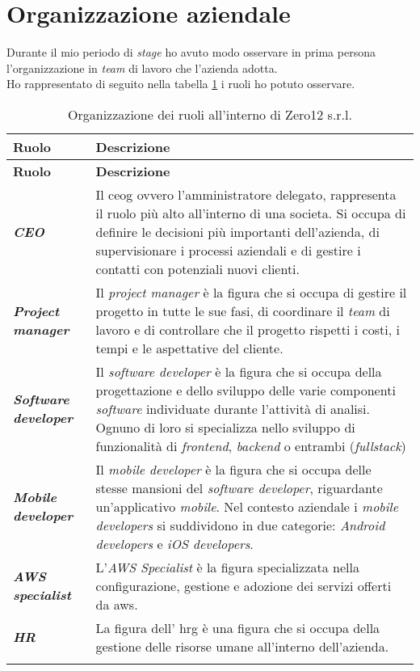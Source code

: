 \section{Organizzazione aziendale}
Durante il mio periodo di \textit{stage} ho avuto modo osservare in prima persona l'organizzazione in \textit{team} di lavoro che l'azienda adotta.\\
Ho rappresentato di seguito nella tabella \ref{tab:ruoli} i ruoli ho potuto osservare.
\renewcommand{\arraystretch}{1.5}
\begin{longtable}{|p{3.5cm}|p{8.7cm}|}
    \hline
    \rowcolor{tableheader}\textbf{Ruolo} & \textbf{Descrizione} \\
    \hline
    \endfirsthead

    \rowcolor{tableheader}\textbf{Ruolo} & \textbf{Descrizione} \\
    \hline
    \endhead

    \hline
    \endfoot

    \hline
    \endlastfoot
    \hline
    \rowcolor{tableoddrow}\textbf{\textit{CEO}} & Il \gls{ceog} ovvero l'amministratore delegato, rappresenta il ruolo più alto all'interno di una societa. Si occupa di definire le decisioni più importanti dell'azienda, di supervisionare i processi aziendali e di gestire i contatti con potenziali nuovi clienti. \\
    \hline
    \rowcolor{tableevenrow}\textbf{\textit{Project manager}} & Il \textit{project manager} è la figura che si occupa di gestire il progetto in tutte le sue fasi, di coordinare il \textit{team} di lavoro e di controllare che il progetto rispetti i costi, i tempi e le aspettative del cliente.\\
    \hline
    \rowcolor{tableoddrow}\textbf{\textit{Software developer}} & Il \textit{software developer} è la figura che si occupa della progettazione e dello sviluppo delle varie componenti \textit{software} individuate durante l'attività di analisi. Ognuno di loro si specializza nello sviluppo di funzionalità di \textit{frontend}, \textit{backend} o entrambi (\textit{fullstack})\\
    \hline
    \rowcolor{tableevenrow}\textbf{\textit{Mobile developer}} & Il \textit{mobile developer} è la figura che si occupa delle stesse mansioni del \textit{software developer}, riguardante un'applicativo \textit{mobile}. Nel contesto aziendale i \textit{mobile developers} si suddividono in due categorie: \textit{Android developers} e \textit{iOS developers}.\\
    \hline
    \rowcolor{tableoddrow}\textbf{\textit{AWS specialist}} & L'\textit{AWS Specialist} è la figura specializzata nella configurazione, gestione e adozione dei servizi offerti da \gls{aws}.\\
    \hline
    \rowcolor{tableevenrow}\textbf{\textit{HR}} & La figura dell' \gls{hrg} è una figura che si occupa della gestione delle risorse umane all'interno dell'azienda.\\
    \hline
    \caption{Organizzazione dei ruoli all'interno di Zero12 s.r.l.}
    \label{tab:ruoli}
\end{longtable}

